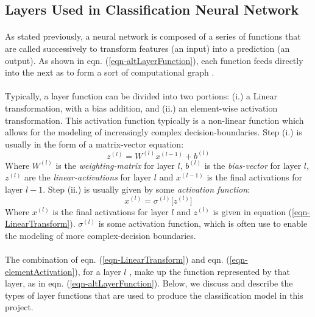 \documentclass[12pt,letterpaper]{article}
\begin{document}

\subsection{Layers Used in Classification Neural Network}
\label{subsec-Layers}

\paragraph*{}As stated previously, a neural network is composed of a series of functions that are called successively to transform features (an input) into a prediction (an output). As shown in eqn. (\ref{eqn-altLayerFunction}), each function feeds directly into the next as to form a sort of computational graph \cite{Goodfellow}. 

\paragraph*{}Typically, a layer function can be divided into two portions: (i.) a Linear transformation, with a bias addition, and (ii.) an element-wise activation transformation. This activation function typically is a non-linear function which allows for the modeling of increasingly complex decision-boundaries. Step (i.) is usually in the form of a matrix-vector equation:
\begin{equation}
\label{eqn-LinearTransform}
z^{(l)} = W^{(l)} x^{(l-1)} + b^{(l)}
\end{equation}
Where $W^{(l)}$ is the \textit{weighting-matrix} for layer $l$, $b^{(l)}$ is the \textit{bias-vector} for layer $l$, $z^{(l)}$ are the \textit{linear-activations} for layer $l$ and $x^{(l-1)}$ is the final activations for layer $l-1$.
Step (ii.) is usually given by some \textit{activation function}:
\begin{equation}
\label{eqn-elementActivation}
x^{(l)} = \sigma^{(l)} \big[ z^{(l)} \big]
\end{equation}
Where $x^{(l)}$ is the final activations for layer $l$ and $z^{(l)}$ is given in equation (\ref{eqn-LinearTransform}). $\sigma^{(l)}$ is some activation function, which is often use to enable the modeling of more complex-decision boundaries. 

\paragraph*{}The combination of eqn. (\ref{eqn-LinearTransform}) and eqn. (\ref{eqn-elementActivation}), for a layer $l$ , make up the function represented by that layer, as in eqn. (\ref{eqn-altLayerFunction}). Below, we discuss and describe the types of layer functions that are used to produce the classification model in this project.
\end{document}
